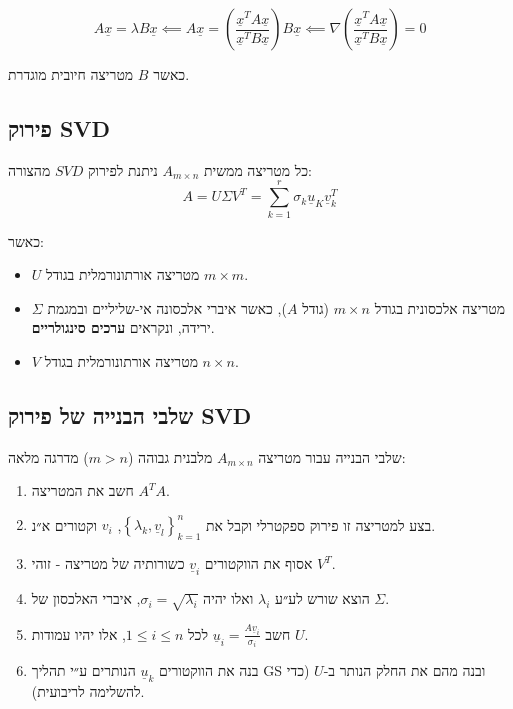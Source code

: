 \documentclass[11pt]{article}
\begin{document}
\[
A\underline{x}= \lambda B\underline{x}
\impliedby
A\underline{x} = \left( \frac{\underline{x}^TA\underline{x}}{\underline{x}^TB\underline{x}} \right) B \underline{x}
\impliedby
\nabla \left( \frac{\underline{x}^TA\underline{x}}{\underline{x}^TB\underline{x}} \right) = 0
\]

כאשר \(B\) מטריצה חיובית מוגדרת.

\subsection{פירוק SVD}
\label{sec:org4edc126}

כל מטריצה ממשית \(A_{m \times n}\) ניתנת לפירוק \(SVD\) מהצורה:
\[
A = U\Sigma V^T = \sum_{k=1}^{r}\sigma_k \underline{u}_K \underline{v}_k^{T}
\]

כאשר:
\begin{itemize}
\item \(U\) מטריצה אורתונורמלית בגודל \(m \times m\).
\item \(\Sigma\) מטריצה אלכסונית בגודל \(m \times n\) (גודל \(A\)), כאשר איברי אלכסונה אי-שליליים ובמגמת ירידה, ונקראים \textbf{ערכים סינגולריים}.
\item \(V\) מטריצה אורתונורמלית בגודל \(n \times n\).
\end{itemize}

\subsection{שלבי הבנייה של פירוק SVD}
\label{sec:org426b392}
שלבי הבנייה עבור מטריצה \(A_{m \times n}\) מלבנית גבוהה (\(m>n\)) מדרגה מלאה:

\begin{enumerate}
\item חשב את המטריצה \(A^TA\).
\item בצע למטריצה זו פירוק ספקטרלי וקבל את \(\left\{ \lambda_k, \underline{v}_l \right\}_{k=1}^n\), \(v_i\) וקטורים א״נ.
\item אסוף את הווקטורים \(\underline{v}_i\) כשורותיה של מטריצה - זוהי \(V^T\).
\item הוצא שורש לע״ע \(\lambda_i\) ואלו יהיה \(\sigma_i = \sqrt{\lambda_i}\), איברי האלכסון של \(\Sigma\).
\item חשב \(\underline{u}_i = \frac{A\underline{v}_i}{\sigma_i}\) לכל \(1 \le i \le n\), אלו יהיו עמודות \(U\).
\item בנה את הווקטורים \(\underline{u}_k\) הנותרים ע״י תהליך GS ובנה מהם את החלק הנותר ב-\(U\) (כדי להשלימה לריבועית).
\end{enumerate}
\end{document}

